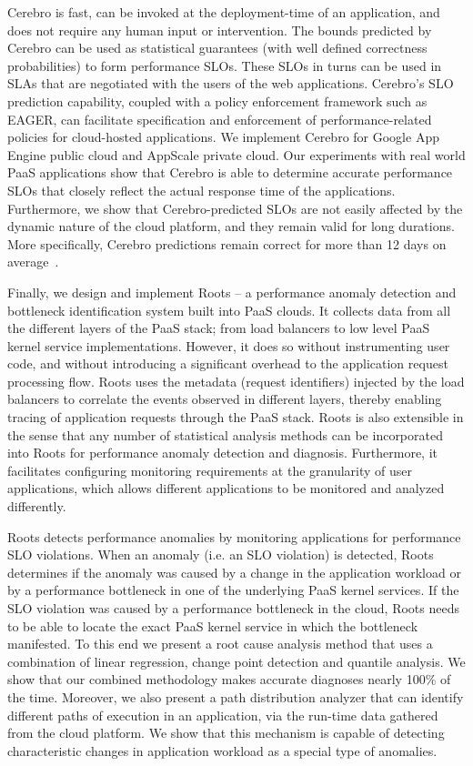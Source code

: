 Cerebro is fast, can be invoked at the deployment-time 
of an application, and does not require any human input or intervention. 
The bounds predicted by Cerebro can be used as statistical guarantees (with well defined correctness
probabilities) to form performance SLOs. These SLOs in turns can be used in SLAs that are negotiated
with the users of the web applications. Cerebro's SLO prediction capability, coupled with a policy
enforcement framework such as EAGER, can facilitate specification and enforcement of performance-related
policies for cloud-hosted applications. We implement Cerebro for Google App Engine public cloud
and AppScale private cloud. Our experiments with real world PaaS applications show that Cerebro
is able to determine accurate performance SLOs that closely reflect the actual response time
of the applications. Furthermore, we show that Cerebro-predicted SLOs are not easily affected by
the dynamic nature of the cloud platform, and they remain valid for long durations. More specifically, 
Cerebro predictions remain correct for more than 12 days on average~\cite{7396174}. 

Finally, we design and implement Roots -- a performance anomaly detection and 
bottleneck identification system built into PaaS clouds. It collects data from all the different layers of the
PaaS stack; from load balancers to low level PaaS kernel service implementations. However,
it does so without instrumenting user code, and without introducing a significant
overhead to the application request processing flow. 
Roots uses the metadata (request identifiers) injected by the load balancers to correlate the
events observed in different layers, 
thereby enabling tracing of application requests through the PaaS stack.
Roots is also extensible in the sense that 
any number of statistical analysis methods can be incorporated into Roots for performance
anomaly detection and diagnosis. Furthermore, it facilitates configuring monitoring requirements
at the granularity of user applications, which allows different applications to be monitored
and analyzed differently. 

Roots detects performance anomalies by monitoring applications for performance SLO violations. 
When an anomaly (i.e. an SLO violation) is detected, Roots determines if
the anomaly was caused by a change in the application workload or by a performance 
bottleneck in one of the underlying PaaS kernel services. If the SLO violation was caused by
a performance bottleneck in the cloud, Roots needs to be able to locate the exact PaaS kernel
service in which the bottleneck manifested. To this end we present a root cause analysis method
that uses a combination of linear regression, change point detection and quantile analysis.
We show that our combined methodology makes accurate diagnoses nearly
100\% of the time. Moreover, we also present a path distribution analyzer that can identify different
paths of execution in an application, via the run-time data gathered from the cloud platform.
We show that this mechanism is capable of detecting characteristic changes in application
workload as a special type of anomalies.

